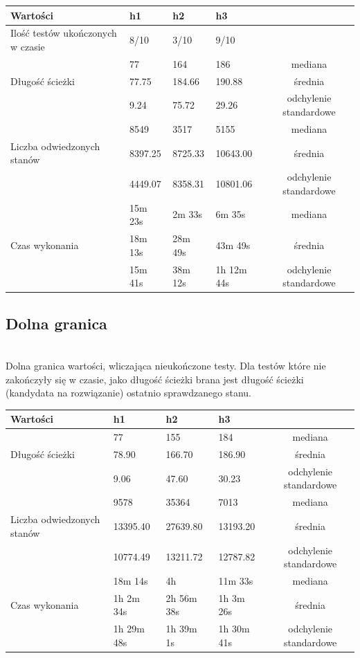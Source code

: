 \begin{tabular}{ |M{3.5cm}|M{2cm}|M{2cm}|M{2cm}|c| } 
    \hline
    Wartości & h1 & h2 & h3 & \\
    \hline
    Ilość testów ukończonych w czasie & 8/10 & 3/10 & 9/10 & \\
    \hline
    & 77    & 164    & 186    & mediana \\
    Długość ścieżki & 77.75 & 184.66 & 190.88 & średnia \\
    & 9.24  & 75.72  & 29.26  & odchylenie standardowe \\
    \hline
    & 8549    & 3517    & 5155     & mediana \\
    Liczba odwiedzonych stanów & 8397.25 & 8725.33 & 10643.00 & średnia \\
    & 4449.07 & 8358.31 & 10801.06 & odchylenie standardowe \\
    \hline
    & 15m 23s &  2m 33s & 6m 35s     & mediana \\
    Czas wykonania & 18m 13s & 28m 49s & 43m 49s    & średnia \\
    & 15m 41s & 38m 12s & 1h 12m 44s & odchylenie standardowe \\
    \hline
\end{tabular}

\subsection*{Dolna granica}
\phantom{.}\\
Dolna granica wartości, wliczająca nieukończone testy. Dla testów które nie zakończyły się w czasie, jako długość ścieżki brana jest długość ścieżki (kandydata na rozwiązanie) ostatnio sprawdzanego stanu.\\

\begin{tabular}{ |M{3.5cm}|M{2cm}|M{2cm}|M{2cm}|c| } 
    \hline
    Wartości & h1 & h2 & h3 & \\
    \hline
    & 77    & 155    & 184    & mediana \\
    Długość ścieżki & 78.90 & 166.70 & 186.90 & średnia \\
    & 9.06  & 47.60  & 30.23  & odchylenie standardowe \\
    \hline
    & 9578     & 35364    & 7013     & mediana \\
    Liczba odwiedzonych stanów & 13395.40 & 27639.80 & 13193.20 & średnia \\
    & 10774.49 & 13211.72 & 12787.82 & odchylenie standardowe \\
    \hline
    & 18m 14s    & 4h         & 11m 33s    & mediana \\
    Czas wykonania & 1h 2m 34s  & 2h 56m 38s & 1h 3m 26s  & średnia \\
    & 1h 29m 48s & 1h 39m 1s  & 1h 30m 41s & odchylenie standardowe \\
    \hline
\end{tabular}

